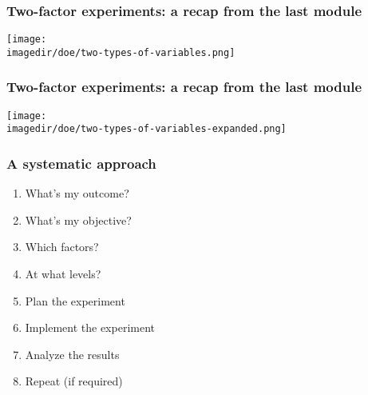 
\begin{frame}\frametitle{Two-factor experiments: a recap from the last module}
    \texttt{[image: \\imagedir/doe/two-types-of-variables.png]}
\end{frame}

\begin{frame}\frametitle{Two-factor experiments: a recap from the last module}
    \texttt{[image: \\imagedir/doe/two-types-of-variables-expanded.png]}
\end{frame}

{
\begin{frame}\frametitle{}
	\vspace{-5cm}
\end{frame}}

\begin{frame}\frametitle{A systematic approach}
	 \begin{enumerate}
	 	\item	What's my outcome? \pause
	 	\item	What's my objective? \pause
	 	\item	Which factors? \pause
		\item	At what levels?\pause
	 	\item	Plan the experiment \pause
	 	\item	Implement the experiment\pause
	 	\item	Analyze the results\pause
		\item	Repeat (if required)
	 \end{enumerate}
	 \vspace{5cm}
\end{frame}


